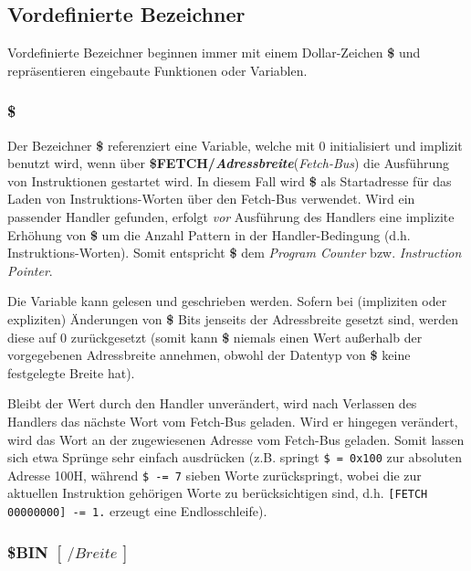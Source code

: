 \documentclass{scrartcl}
\begin{document}
\subsection{Vordefinierte Bezeichner}

\noindent Vordefinierte Bezeichner beginnen immer mit einem Dollar-Zeichen \textbf{\$} und repräsentieren eingebaute Funktionen oder Variablen.

\subsubsection{\$}

\noindent Der Bezeichner \textbf{\$} referenziert eine Variable, welche mit 0 initialisiert und implizit benutzt wird, wenn über \textbf{\$FETCH/\textit{Adressbreite}}(\textit{Fetch-Bus}) die Ausführung von Instruktionen gestartet wird. In diesem Fall wird \textbf{\$} als Startadresse für das Laden von Instruktions-Worten über den Fetch-Bus verwendet. Wird ein passender Handler gefunden, erfolgt \textit{vor} Ausführung des Handlers eine implizite Erhöhung von \textbf{\$} um die Anzahl Pattern in der Handler-Bedingung (d.h. Instruktions-Worten). Somit entspricht \textbf{\$} dem \textit{Program Counter} bzw. \textit{Instruction Pointer}.

\vspace{10pt}
\noindent Die Variable kann gelesen und geschrieben werden. Sofern bei (impliziten oder expliziten) Änderungen von \textbf{\$} Bits jenseits der Adressbreite gesetzt sind, werden diese auf 0 zurückgesetzt (somit kann \textbf{\$} niemals einen Wert außerhalb der vorgegebenen Adressbreite annehmen, obwohl der Datentyp von \textbf{\$} keine festgelegte Breite hat).

\vspace{10pt}
\noindent Bleibt der Wert durch den Handler unverändert, wird nach Verlassen des Handlers das nächste Wort vom Fetch-Bus geladen. Wird er hingegen verändert, wird das Wort an der zugewiesenen Adresse vom Fetch-Bus geladen. Somit lassen sich etwa Sprünge sehr einfach ausdrücken (z.B. springt \texttt{\$~=~0x100} zur absoluten Adresse 100H, während \texttt{\$~-=~7} sieben Worte zurückspringt, wobei die zur aktuellen Instruktion gehörigen Worte zu berücksichtigen sind, d.h. \texttt{[FETCH 00000000]~-=~1.} erzeugt eine Endlosschleife).

\subsubsection{\$BIN $[~/Breite~]$}
\end{document}
